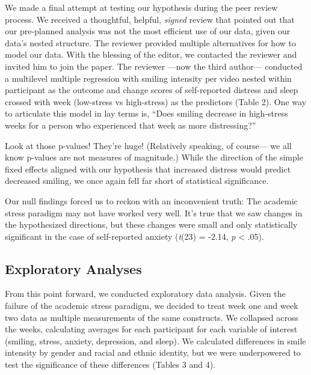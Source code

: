 \documentclass[authordate, empirical]{jote-new-article}
\begin{document}
We made a final attempt at testing our hypothesis during the peer review process. We received a thoughtful, helpful, \emph{signed }review that pointed out that our pre-planned analysis was not the most efficient use of our data, given our data's nested structure. The reviewer provided multiple alternatives for how to model our data. With the blessing of the editor, we contacted the reviewer and invited him to join the paper. The reviewer —now the third author— conducted a multilevel multiple regression with smiling intensity per video nested within participant as the outcome and change scores of self-reported distress and sleep crossed with week (low-stress vs high-stress) as the predictors (Table 2). One way to articulate this model in lay terms is, ``Does smiling decrease in high-stress weeks for a person who experienced that week as more distressing?”













Look at those p-values! They're huge! (Relatively speaking, of course— we all know p-values are not measures of magnitude.) While the direction of the simple fixed effects aligned with our hypothesis that increased distress would predict decreased smiling, we once again fell far short of statistical significance.



Our null findings forced us to reckon with an inconvenient truth: The academic stress paradigm may not have worked very well. It's true that we saw changes in the hypothesized directions, but these changes were small and only statistically significant in the case of self-reported anxiety (\emph{t}(23) = -2.14, \emph{p} < .05).








\subsection{Exploratory Analyses}



From this point forward, we conducted exploratory data analysis. Given the failure of the academic stress paradigm, we decided to treat week one and week two data as multiple measurements of the same constructs. We collapsed across the weeks, calculating averages for each participant for each variable of interest (smiling, stress, anxiety, depression, and sleep). We calculated differences in smile intensity by gender and racial and ethnic identity, but we were underpowered to test the significance of these differences (Tables 3 and 4).
\end{document}
